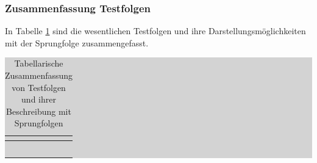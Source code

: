 \subsubsection{Zusammenfassung Testfolgen}

\noindent In Tabelle \ref{tab:threethree} sind die wesentlichen Testfolgen und ihre Darstellungsm\"{o}glichkeiten mit der Sprungfolge zusammengefasst.

\begin{table}[H]
\setlength{\arrayrulewidth}{.1em}
\caption{Tabellarische Zusammenfassung von Testfolgen und ihrer Beschreibung mit Sprungfolgen}
\setlength{\fboxsep}{0pt}%
\colorbox{lightgray}{%
%
\begin{tabular}{| l | l |}
\hline
\parbox[c][0.45in][c]{3.3in}{\smallskip\centering\textbf{\selectfont{Testfolgen}}} & \parbox[c][0.45in][c]{3.3in}{\smallskip\centering\textbf{\selectfont{Mathematische Beschreibung durch Sprungfolgen}}}\\ \hline
\parbox[c][0.64in][c]{3.3in}{} & 
\parbox[c][0.64in][c]{3.3in}{\centering{$\delta \left[k\right]=\sigma \left[k\right]-\sigma \left[k-1\right]$ }}\\ \hline 

\parbox[c][0.64in][c]{3.3in}{} & 
\parbox[c][0.64in][c]{3.3in}{}\\ \hline


\parbox[c][0.64in][c]{3.3in}{} & \parbox[c][0.64in][c]{3.3in}{}\\ \hline

\parbox[c][0.64in][c]{3.3in}{} & \parbox[c][0.64in][c]{3.3in}{}\\ \hline

\parbox[c][0.64in][c]{3.3in}{\centering{}} & 
\parbox[c][0.64in][c]{3.3in}{}\\ \hline

\end{tabular}%
}
\label{tab:threethree}
\end{table}

